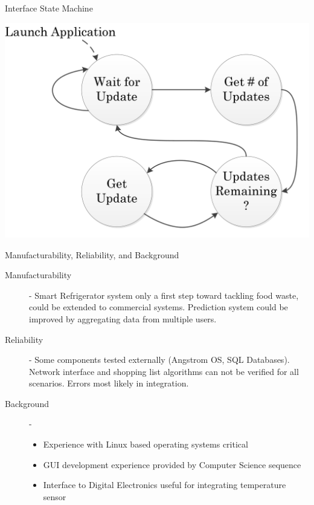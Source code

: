 \documentclass[t]{beamer}
\begin{document}
\begin{frame}{Interface State Machine}
\begin{center}
\includegraphics[scale=0.7]{../Graphics/StateMachine}
\end{center}
\end{frame}

\begin{frame}{Manufacturability, Reliability, and Background}
\begin{description}
\item[Manufacturability] - Smart Refrigerator system only a first step toward tackling food waste, could be extended to commercial systems. Prediction system could be improved by aggregating data from multiple users.
\item[Reliability] - Some components tested externally (Angstrom OS, SQL Databases). Network interface and shopping list algorithms can not be verified for all scenarios. Errors most likely in integration.
\item[Background] -
\begin{itemize}
\item Experience with Linux based operating systems critical
\item GUI development experience provided by Computer Science sequence
\item Interface to Digital Electronics useful for integrating temperature sensor
\end{itemize}
\end{description}
\end{frame}
\end{document}
